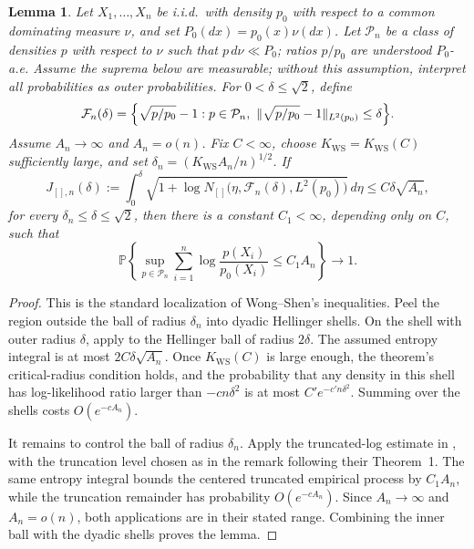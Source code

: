\documentclass[11pt]{article}
\newtheorem{lemma}[theorem]{Lemma}
\theoremstyle{definition}
\numberwithin{equation}{section}
\begin{document}
\begin{lemma}
\label{lem:wong-shen-local}
Let $X_1,\dots,X_n$ be i.i.d.\ with density $p_0$ with respect to a common dominating measure \(\nu\), and set \(P_0(dx)=p_0(x)\nu(dx)\). Let $\mathcal P_n$ be a class of densities \(p\) with respect to \(\nu\) such that \(p\,d\nu\ll P_0\); ratios \(p/p_0\) are understood \(P_0\)-a.e. Assume the suprema below are measurable; without this assumption, interpret all probabilities as outer probabilities. For $0<\delta\le\sqrt2$, define
\[
    \mathcal F_n(\delta)
    =
    \Bigl\{
        \sqrt{p/p_0}-1:
        p\in\mathcal P_n,\
        \|\sqrt{p/p_0}-1\|_{L^2(p_0)}\le\delta
    \Bigr\}.
\]
Assume \(A_n\to\infty\) and \(A_n=o(n)\). Fix \(C<\infty\), choose
\(K_{\mathrm{WS}}=K_{\mathrm{WS}}(C)\) sufficiently large, and set
\(\delta_n=(K_{\mathrm{WS}}A_n/n)^{1/2}\). If
\[
    J_{[],n}(\delta)
    :=
    \int_0^\delta
    \sqrt{
        1+\log N_{[]}\bigl(
            \eta,\mathcal F_n(\delta),L^2(p_0)
        \bigr)
    }
    \,d\eta
    \le C\delta\sqrt{A_n},
\]
for every $\delta_n\le\delta\le\sqrt2$, then there is a constant $C_1<\infty$, depending only on $C$, such that
\[
    \mathbb P\left\{
    \sup_{p\in\mathcal P_n}
    \sum_{i=1}^n\log\frac{p(X_i)}{p_0(X_i)}
    \le C_1A_n
    \right\}\to1.
\]
\end{lemma}

\begin{proof}
This is the standard localization of Wong--Shen's inequalities. Peel the
region outside the ball of radius \(\delta_n\) into dyadic Hellinger shells.
On the shell with outer radius \(\delta\), apply
\cite[Theorem~1]{wong1995probability} to the Hellinger ball of radius
\(2\delta\). The assumed entropy integral is at most
\(2C\delta\sqrt{A_n}\). Once \(K_{\mathrm{WS}}(C)\) is large enough, the
theorem's critical-radius condition holds, and the probability that any
density in this shell has log-likelihood ratio larger than
\(-c n\delta^2\) is at most \(C'e^{-c'n\delta^2}\). Summing over the shells
costs \(O(e^{-cA_n})\).

It remains to control the ball of radius \(\delta_n\). Apply the
truncated-log estimate in \cite[Lemma~7]{wong1995probability}, with the
truncation level chosen as in the remark following their Theorem~1. The same
entropy integral bounds the centered truncated empirical process by
\(C_1A_n\), while the truncation remainder has probability
\(O(e^{-cA_n})\). Since \(A_n\to\infty\) and \(A_n=o(n)\), both applications
are in their stated range. Combining the inner ball with the dyadic shells
proves the lemma.
\end{proof}
\end{document}
